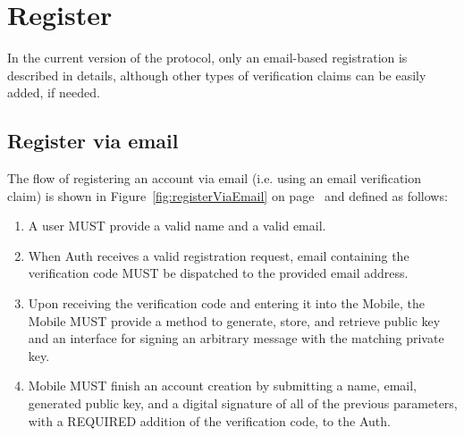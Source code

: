 \section{Register}
In the current version of the protocol, only an email-based registration is described in details, although 	
other types of verification claims can be easily added, if needed.

      \subsection{Register via email}
      The flow of registering an account via email (i.e. using an email verification claim) is shown in 
      Figure~\ref{fig:registerViaEmail} on page~\pageref{fig:registerViaEmail} and defined as follows:
      \begin{enumerate}
            \item A user MUST provide a valid name and a valid email.
            \item When Auth receives a valid registration request, email containing the verification code MUST 
                  be dispatched to the provided email address.
            \item Upon receiving the verification code and entering it into the Mobile, the Mobile MUST provide 
                  a method to generate, store, and retrieve public key and an interface for signing an arbitrary 
                  message with the matching private key.
            \item Mobile MUST finish an account creation by submitting a name, email, generated public key, and 
                  a digital signature of all of the previous parameters, with a REQUIRED addition of the 
                  verification code, to the Auth.
      \end{enumerate}  
      

